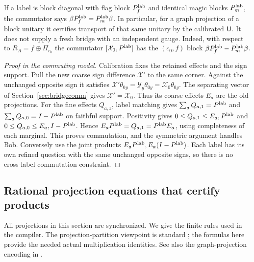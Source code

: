 If a label is block diagonal with flag block $P^{\rm lab}_{f}$ and identical magic blocks $P^{\rm lab}_{m}$, the commutator says $\beta P^{\rm lab}_{f}=P^{\rm lab}_{m}\beta$. In particular, for a graph projection of a block unitary it certifies transport of that same unitary by the calibrated ${\mathsf U}$. It does not supply a fresh bridge with an independent gauge.
Indeed, with respect to $R_A=f\oplus\Pi_{c_0}$ the commutator $[\mathcal X_0,P^{\rm lab}]$ has the $(c_0,f)$ block $\beta P^{\rm lab}_f-P^{\rm lab}_m\beta$.

\begin{proof}[Proof in the commuting model]
Calibration fixes the retained effects and the sign support. Pull the new coarse sign difference $\mathcal X'$ to the same corner. Against the unchanged opposite sign it satisfies $\mathcal X'\theta_{0y}=\mathcal Y_y\theta_{0y}=\mathcal X_0\theta_{0y}$. The separating vector of Section~\ref{sec:bridgecomm} gives $\mathcal X'=\mathcal X_0$. Thus its coarse effects $E_a$ are the old projections. For the fine effects $Q_{a,z}$, label matching gives $\sum_aQ_{a,1}=P^{\rm lab}$ and $\sum_aQ_{a,0}=I-P^{\rm lab}$ on faithful support. Positivity gives $0\leq Q_{a,1}\leq E_a,P^{\rm lab}$ and $0\leq Q_{a,0}\leq E_a,I-P^{\rm lab}$. Hence $E_aP^{\rm lab}=Q_{a,1}=P^{\rm lab}E_a$, using completeness of each marginal. This proves commutation, and the symmetric argument handles Bob. Conversely use the joint products $E_aP^{\rm lab},E_a(I-P^{\rm lab})$. Each label has its own refined question with the same unchanged opposite signs, so there is no cross-label commutation constraint.
\end{proof}

\subsection{Rational projection equations that certify products}\label{sec:projection}
All projections in this section are synchronized. We give the finite rules used in the compiler. The projection-partition viewpoint is standard \cite{Fritz}; the formulas here provide the needed actual multiplication identities. See also the graph-projection encoding in \cite[Section 4]{CZ}.

